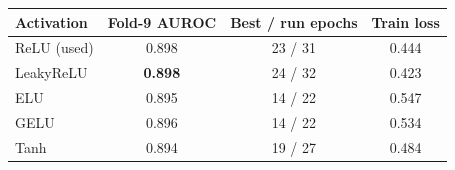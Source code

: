 \begin{tabular}{@{}lccc@{}}
\toprule
Activation & Fold-9 AUROC & Best / run epochs & Train loss \\
\midrule
ReLU (used) & 0.898 & 23 / 31 & 0.444 \\
LeakyReLU & \textbf{0.898} & 24 / 32 & 0.423 \\
ELU & 0.895 & 14 / 22 & 0.547 \\
GELU & 0.896 & 14 / 22 & 0.534 \\
Tanh & 0.894 & 19 / 27 & 0.484 \\
\bottomrule
\end{tabular}
